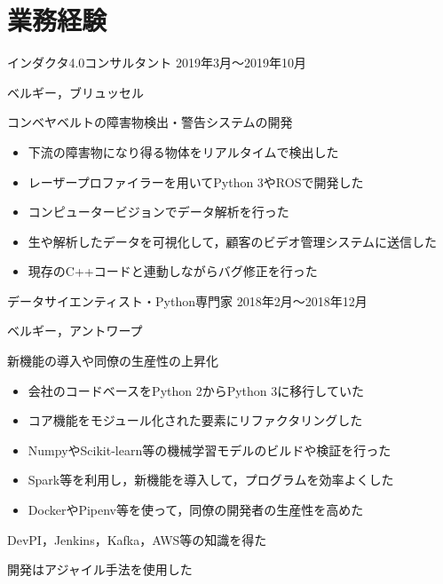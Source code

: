 \documentclass[10pt, a4paper]{article}
\begin{document}
\section{業務経験}
\begin{outerlist}
\item[\href{https://kapernikov.com}{\parbox[t]{3cm}{\raggedleft Kapernikov有限会社}}]{インダクタ4.0コンサルタント} \hfill {2019年3月〜2019年10月}

\hfill ベルギー，ブリュッセル
    \begin{innerlist}
    \item コンベヤベルトの障害物検出・警告システムの開発
    \begin{itemize}
      \item 下流の障害物になり得る物体をリアルタイムで検出した
      \item レーザープロファイラーを用いてPython 3やROSで開発した
      \item コンピュータービジョンでデータ解析を行った
      \item 生や解析したデータを可視化して，顧客のビデオ管理システムに送信した
      \item 現存のC++コードと連動しながらバグ修正を行った
    \end{itemize}
    \end{innerlist}

\item[\href{https://sentiance.com}{\parbox[t]{3cm}{\raggedleft Sentiance有限会社}}]{データサイエンティスト・Python専門家} \hfill {2018年2月〜2018年12月}

\hfill ベルギー，アントワープ
    \begin{innerlist}
    \item 新機能の導入や同僚の生産性の上昇化
    \begin{itemize}
        \item 会社のコードベースをPython 2からPython 3に移行していた
        \item コア機能をモジュール化された要素にリファクタリングした
        \item NumpyやScikit-learn等の機械学習モデルのビルドや検証を行った
        \item Spark等を利用し，新機能を導入して，プログラムを効率よくした
        \item DockerやPipenv等を使って，同僚の開発者の生産性を高めた
    \end{itemize}
    \item DevPI，Jenkins，Kafka，AWS等の知識を得た
    \item 開発はアジャイル手法を使用した
    \end{innerlist}
\end{outerlist}
\end{document}
